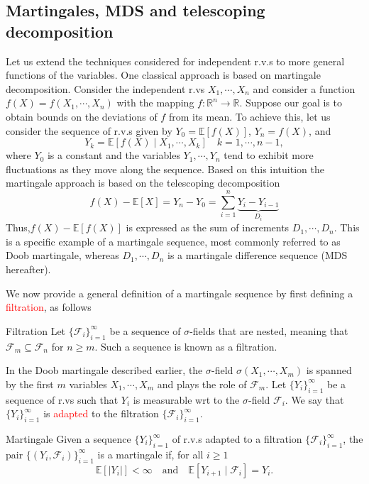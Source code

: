 \documentclass[10pt,handout,english]{beamer}
\newcommand{\E}{\mathbb{E}}
\newcommand{\R}{\mathbb{R}}
\newcommand{\F}{\mathcal{F}}
\begin{document}
\subsection{Martingales, MDS and telescoping decomposition}

\begin{frame}[allowframebreaks]
Let us extend the techniques considered for independent r.v.s to more general functions of the variables. One classical approach is based on martingale decomposition. Consider the independent r.vs $X_1,\cdots,X_n$ and consider a function $f(X)=f(X_1,\cdots,X_n)$ with the mapping $f:\R^n\to\R$. Suppose our goal is to obtain bounds on the deviations of $f$ from its mean. To achieve this, let us consider the sequence of r.v.s given by $Y_0=\E[f(X)]$, $Y_n=f(X)$, and
\[
Y_k=\E[f(X)\mid X_1,\cdots,X_k]\quad k=1,\cdots,n-1,
\]
where $Y_0$ is a constant and the variables $Y_1,\cdots,Y_n$ tend to exhibit more fluctuations as they move along the sequence. Based on this intuition the martingale approach is based on the telescoping decomposition 
\[
f(X)-\E[X]=Y_n-Y_0=\sum\limits_{i=1}^n\underbrace{Y_i-Y_{i-1}}_{D_i}
\]
Thus,$f(X)-\E[f(X)]$ is expressed as the sum of increments $D_1,\cdots,D_n$. This is a specific example of a martingale sequence, most commonly referred to as Doob martingale, whereas $D_{1},\cdots,D_n$ is a martingale difference sequence (MDS hereafter).

We now provide a general definition of a martingale sequence by first defining a \textcolor{red}{filtration}, as follows
\begin{block}{Filtration}
Let $\{\F_i\}_{i=1}^{\infty}$ be a sequence of $\sigma$-fields that are nested, meaning that $\F_{m}\subseteq\F_{n}$ for $n\geq m$. Such a sequence is known as a filtration.
\end{block}
In the Doob martingale described earlier, the $\sigma$-field $\sigma(X_1,\cdots,X_m)$ is spanned by the first $m$ variables $X_1,\cdots,X_m$ and plays the role of $\F_m$. Let $\{Y_i\}_{i=1}
^{\infty}$ be a sequence of r.vs such that $Y_i$ is measurable wrt to the $\sigma$-field $\F_{i}$. We say that $\{Y_i\}_{i=1}^{\infty}$ is \textcolor{red}{adapted} to the filtration $\{\F_{i}\}_{i=1}^{\infty}$. 
\begin{block}{Martingale}
Given a sequence $\{Y_{i}\}_{i=1}^{\infty}$ of r.v.s adapted to a filtration $\{\F_i\}_{i=1}^{\infty}$, the pair $\{(Y_i,\F_i)\}_{i=1}^{\infty}$ is a martingale if, for all $i\geq 1$
\[
\E[\lvert Y_i\rvert]<\infty\quad\text{and}\quad\E[Y_{i+1}\mid\F_{i}]=Y_{i}.
\]
\end{block}
\end{frame}
\end{document}
